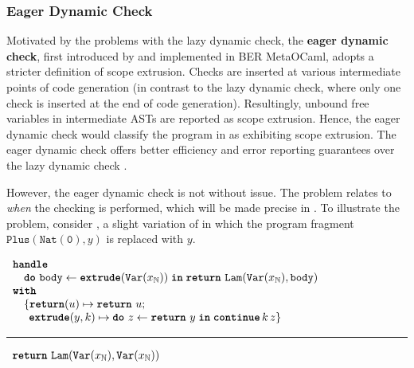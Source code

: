 \subsubsection{Eager Dynamic Check}\label{subsubsection:eager-dynamic-check}
Motivated by the problems with the lazy dynamic check, the \textbf{eager dynamic check}, first introduced by \citet{kiselyov-14} and implemented in BER MetaOCaml, adopts a stricter definition of scope extrusion. Checks are inserted at various intermediate points of code generation (in contrast to the lazy dynamic check, where only one check is inserted at the end of code generation). Resultingly, unbound free variables in intermediate ASTs are reported as scope extrusion. Hence, the eager dynamic check would classify the program in  as exhibiting scope extrusion. The eager dynamic check offers better efficiency and error reporting guarantees over the lazy dynamic check \citep{kiselyov-14}.

However, the eager dynamic check is not without issue. The problem relates to \textit{when} the checking is performed, which will be made precise in . To illustrate the problem, consider , a slight variation of  in which the program fragment $\texttt{Plus}({\texttt{Nat}(\texttt{0})}, y)$ is replaced with $y$. 

\begin{code}
  \begin{efflst}
    $\begin{array}{l}
      \textbf{\texttt{handle}} \\
      \quad \texttt{\textbf{do}} \,\, {\texttt{body}} \leftarrow {\textbf{\texttt{extrude}}({\texttt{Var}(x_{\mathbb{N}})})} \; \textbf{\texttt{in}} \; {\texttt{\textbf{return}} \,\, {\texttt{Lam}(\texttt{Var}(x_{\mathbb{N}}), \texttt{body})}} \\
      \textbf{\texttt{with}} \\
      \quad \{ \textbf{\texttt{return}}(u) \mapsto \texttt{\textbf{return}} \,\, {u}; \\
      \quad \; \, \textbf{\texttt{extrude}}(y, k) \mapsto { \texttt{\textbf{do}} \,\, {z} \leftarrow {\texttt{\textbf{return}} \,\, {y}} \; \textbf{\texttt{in}} \; {\textbf{\texttt{continue}} \, {k} \, {z}}} \}\\
    \end{array}$

    \vspace{2mm} 
\textcolor{effComment}{\hrule height 0.2mm \relax}
\vspace{2mm} 

\textcolor{effComment}{$\begin{array}{l}\texttt{\textbf{return}} \,\, {\texttt{Lam}(\texttt{Var}(x_{\mathbb{N}}), \texttt{Var}(x_{\mathbb{N}}))}\end{array}$}

\end{efflst}
%
\label{listing:efflang-maybe-not-scope-extrusion}
\end{code}

